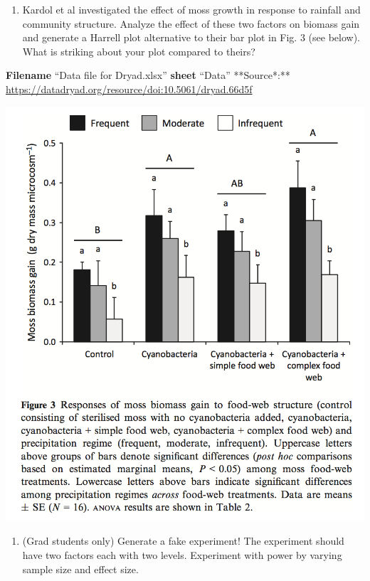 \documentclass[]{book}
\providecommand{\tightlist}{%
  \setlength{\itemsep}{0pt}\setlength{\parskip}{0pt}}
\begin{document}
\begin{enumerate}
\def\labelenumi{\arabic{enumi}.}
\setcounter{enumi}{2}
\tightlist
\item
  Kardol et al investigated the effect of moss growth in response to rainfall and community structure. Analyze the effect of these two factors on biomass gain and generate a Harrell plot alternative to their bar plot in Fig. 3 (see below). What is striking about your plot compared to theirs?
\end{enumerate}

\textbf{Filename} ``Data file for Dryad.xlsx''
\textbf{sheet} ``Data''
**Source*:** \url{https://datadryad.org/resource/doi:10.5061/dryad.66d5f}

\includegraphics{images/kardol_fig_3.png}

\begin{enumerate}
\def\labelenumi{\arabic{enumi}.}
\setcounter{enumi}{3}
\tightlist
\item
  (Grad students only) Generate a fake experiment! The experiment should have two factors each with two levels. Experiment with power by varying sample size and effect size.
\end{enumerate}
\end{document}
